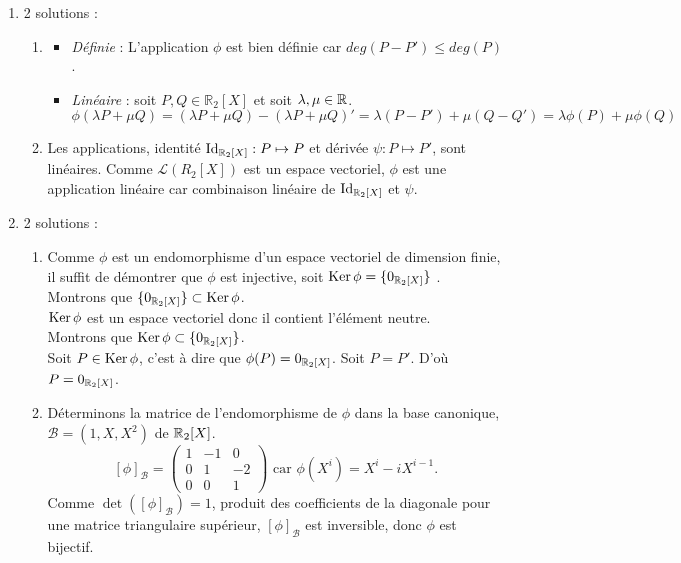 \documentclass{book}
\begin{document}
\begin{enumerate}
\item 2 solutions :
\begin{enumerate}
\item 
\begin{itemize}
\item \textit{Définie} : L'application $\phi$ est bien définie car $deg(P-P')\leq deg(P)$.
\item \textit{Linéaire} : soit $P,Q\in \mathbb R_2[X]$ et soit $\lambda,\mu \in \mathbb{R} $.\\
$$\phi(\lambda P + \mu Q)= (\lambda P + \mu Q)-(\lambda P + \mu Q)'=\lambda (P - P')+\mu(Q - Q')= \lambda\phi( P) + \mu \phi(Q) $$
\end{itemize} 
\item Les applications, identité $\mathrm{Id}_{\mathbb{R} _2[X]}:P\mapsto P$ et dérivée $\psi:P\mapsto P'$, sont linéaires. Comme $\mathcal{L}(R_2[X])$ est un espace vectoriel, $\phi$ est une application linéaire car combinaison linéaire de $\mathrm{Id}_{\mathbb{R} _2[X]}$ et $\psi$. 
\end{enumerate}
\item 2 solutions :
\begin{enumerate}
\item Comme $\phi$ est un endomorphisme d'un espace vectoriel de dimension finie, il suffit de démontrer que  $\phi$ est injective, soit  $\operatorname{Ker}\phi=\{0_{\mathbb{R} _2[X]} \}$ .\\
Montrons que  $\{0_{\mathbb{R} _2[X]} \} \subset \operatorname{Ker}\phi $.\\
\hspace{1cm}$\operatorname{Ker}\phi$ est un espace vectoriel donc il contient l'élément neutre.\\
Montrons que $\operatorname{Ker}\phi   \subset \{0_{\mathbb{R} _2[X]} \}$.\\
\hspace{1cm}Soit $P\in \operatorname{Ker}\phi$, c'est à dire que $\phi(P)=0_{\mathbb{R} _2[X]}$. Soit $P=P'$. D'où $P=0_{\mathbb{R} _2[X]}$.
\item  Déterminons la matrice de l'endomorphisme de $\phi$ dans la base canonique, $\mathcal{B}=(1,X,X^2)$ de $\mathbb{R} _2[X]$.
$$[\phi]_{\mathcal{B}}=\begin{pmatrix}1 &-1&0\\0 &1&-2\\0&0&1 \end{pmatrix}\text{ car } \phi(X^i)=X^i-i  X^{i-1}.$$
Comme $\det ([\phi]_{\mathcal{B}})=1$, produit des coefficients de la diagonale pour une matrice triangulaire supérieur,  $[\phi]_{\mathcal{B}}$ est inversible, donc $\phi$ est bijectif.  

\end{enumerate}
\end{enumerate}
\end{document}

